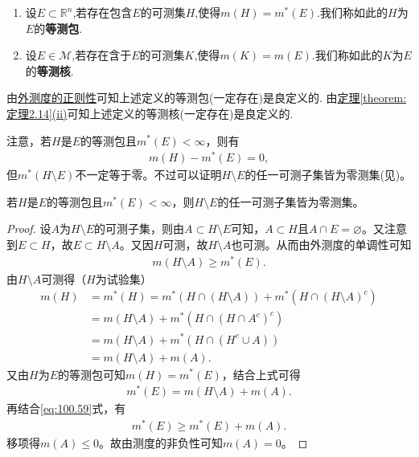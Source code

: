 \documentclass[../../main.tex]{subfiles}
\begin{document}
\begin{definition}[等测包与等测核]
\begin{enumerate}
\item 设$E\subset \mathbb{R}^n$,若存在包含$E$的可测集$H$,使得$m(H)=m^*(E)$.我们称如此的$H$为$E$的\textbf{等测包}.

\item 设$E\in \mathscr{M}$,若存在含于$E$的可测集$K$,使得$m(K)=m(E)$.我们称如此的$K$为$E$的\textbf{等测核}.
\end{enumerate}
\end{definition}
\begin{note}
由\hyperref[theorem:外测度的正则性]{外测度的正则性}可知上述定义的等测包(一定存在)是良定义的.
由\hyperref[theorem:定理2.14]{定理\ref{theorem:定理2.14}(ii)}可知上述定义的等测核(一定存在)是良定义的.
\end{note}
\begin{remark}
注意，若\(H\)是\(E\)的等测包且\(m^*(E)<\infty\)，则有
\begin{align*}
m(H) - m^*(E) = 0,
\end{align*}
但\(m^*(H\setminus E)\)不一定等于零。不过可以证明\(H\setminus E\)的任一可测子集皆为零测集(见)。
\end{remark}

\begin{proposition}\label{proposition:等测包与原集合差的可测子集必为零测集}
若\(H\)是\(E\)的等测包且\(m^*(E)<\infty\)，则\(H\setminus E\)的任一可测子集皆为零测集。
\end{proposition}
\begin{proof}
设\(A\)为\(H\setminus E\)的可测子集，则由\(A\subset H\setminus E\)可知，\(A\subset H\)且\(A\cap E=\varnothing\)。又注意到\(E\subset H\)，故\(E\subset H\setminus A\)。又因\(H\)可测，故\(H\setminus A\)也可测。从而由外测度的单调性可知
\begin{align}
m(H\setminus A)\geqslant m^*(E).\label{eq:100.59}
\end{align}
由\(H\setminus A\)可测得（\(H\)为试验集）
\begin{align*}
m(H)&=m^*(H)=m^*(H\cap(H\setminus A))+m^*(H\cap(H\setminus A)^c)\\
&=m(H\setminus A)+m^*(H\cap(H\cap A^c)^c)
\\
&=m(H\setminus A)+m^*(H\cap(H^c\cup A))\\
&=m(H\setminus A)+m(A).
\end{align*}
又由\(H\)为\(E\)的等测包可知\(m(H)=m^*(E)\)，结合上式可得
\begin{align*}
m^*(E)=m(H\setminus A)+m(A).
\end{align*}
再结合\eqref{eq:100.59}式，有
\begin{align*}
m^*(E)\geqslant m^*(E)+m(A).
\end{align*}
移项得\(m(A)\leqslant0\)。故由测度的非负性可知\(m(A)=0\)。

\end{proof}
\end{document}

